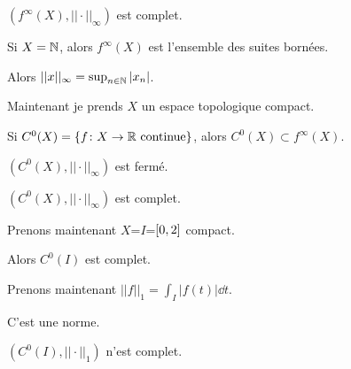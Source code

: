 \documentclass[french,a4paper,10pt]{article}
\begin{document}
    \begin{proposition}
        $(f^\infty(X), ||\cdot||_\infty)$ est complet.
    \end{proposition}

    \begin{remark}
        Si $X=\mathbb{N}$, alors $f^\infty(X)$ est l'ensemble des suites bornées.

        Alors $|| x ||_\infty = \sup_{n\in\mathbb{N}}|x_n|$.
    \end{remark}

    Maintenant je prends $X$ un espace topologique compact.

    Si $C^0(X)=\{f\colon X\to\mathbb{R}\text{ continue}\}$, alors $C^0(X)\subset f^\infty(X)$.

    \begin{proposition}
        $(C^0(X), ||\cdot||_\infty)$ est fermé.
    \end{proposition}

    \begin{corollaire}
        $(C^0(X), ||\cdot||_\infty)$ est complet.
    \end{corollaire}

    Prenons maintenant $X$=$I$=$\mathopen{[}0, 2\mathclose{]}$ compact.

    Alors $C^0(I)$ est complet.

    Prenons maintenant $||f||_1 = \int_I |f(t)|\dd t$.

    C'est une norme.

    \begin{proposition}
        $(C^0(I), ||\cdot||_1)$ n'est  complet.
    \end{proposition}
\end{document}

